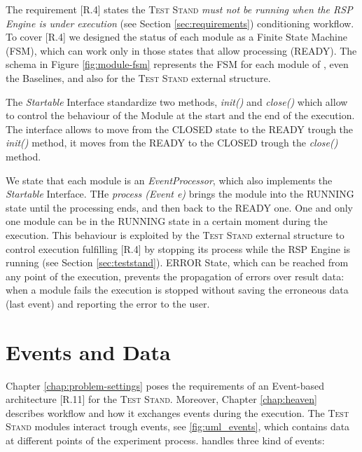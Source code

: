 The requirement [R.4] states the \textsc{Test Stand} \textit{must not be running when the RSP Engine is under execution} (see Section \ref{sec:requirements}) conditioning \name workflow. To cover [R.4] we designed the status of each module  as a Finite State Machine (FSM), which can work only in those states that allow processing (READY). The schema in Figure \ref{fig:module-fsm} represents the FSM for each module of \name, even the Baselines, and also for the \textsc{Test Stand} external structure. 


The \textit{Startable} Interface standardize two methods, \textit{init()} and \textit{close() }which allow to control the behaviour of the Module at the start and the end of the execution. The interface allows to move from the CLOSED state to the READY trough the \textit{init()} method, it moves from the READY to the CLOSED trough the \textit{close()} method. 

We state that each module is an \textit{EventProcessor}, which also implements the \textit{Startable} Interface. THe \textit{process (Event e)} brings the module into the RUNNING state until the processing ends, and then back to the READY one. One and only one module can be in the RUNNING state in a certain moment during the execution. This behaviour is exploited by the \textsc{Test Stand} external structure to control execution fulfilling [R.4] by stopping its process while the RSP Engine is running (see Section \ref{sec:teststand}). ERROR State, which can be reached from any point of the execution, prevents the propagation of errors over result data: when a module fails the execution is stopped without saving the erroneous data (last event) and reporting the error to the user.

\section{Events and Data}\label{sec:data-impl}

Chapter \ref{chap:problem-settings} poses the requirements of an Event-based architecture [R.11] for the \textsc{Test Stand}. Moreover, Chapter \ref{chap:heaven} describes \name workflow and how it exchanges events during the execution. The \textsc{Test Stand} modules interact trough events, see \ref{fig:uml_events},  which contains data at different points of the experiment process. \name handles three kind of events:

